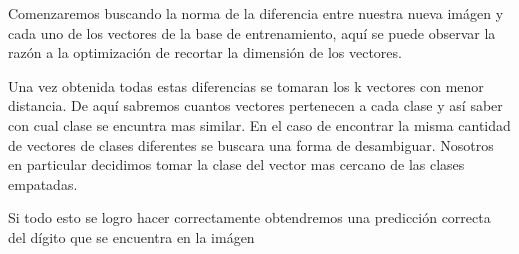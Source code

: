 Comenzaremos buscando la norma de la diferencia entre nuestra nueva imágen y cada uno de los vectores de la base de entrenamiento, aquí se puede observar la razón a la optimización de recortar la dimensión de los vectores.

Una vez obtenida todas estas diferencias se tomaran los k vectores con menor distancia. De aquí sabremos cuantos vectores pertenecen a cada clase y así saber con cual clase se encuntra mas similar. En el caso de encontrar la misma cantidad de vectores de clases diferentes se buscara una forma de desambiguar. Nosotros en particular decidimos tomar la clase del vector mas cercano de las clases empatadas.

Si todo esto se logro hacer correctamente obtendremos una predicción correcta del dígito que se encuentra en la imágen